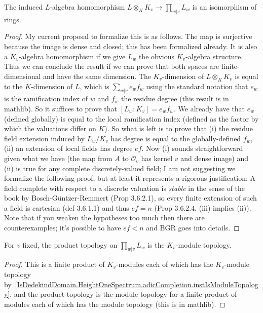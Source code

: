 \begin{theorem}
  \label{IsDedekindDomain.HeightOneSpectrum.adicCompletion.baseChangeAlgEquiv}
  \leanok
  The induced $L$-algebra homomorphism $L\otimes_KK_v\to\prod_{w|v}L_w$ is an
  isomorphism of rings.
\end{theorem}
\begin{proof}

  My current proposal to formalize this is as follows. The map is surjective
  because the image is dense and closed; this has been formalized already.
  It is also a $K_v$-algebra homomorphism if we give $L_w$ the obvious $K_v$-algebra
  structure. Thus we can conclude the result if we can prove that both spaces are
  finite-dimensional and have the same dimension. The $K_v$-dimension of $L\otimes_KK_v$
  is equal to the $K$-dimension of $L$, which is $\sum_{w|v}e_wf_w$ using the standard
  notation that $e_w$ is the ramification index of $w$ and $f_w$ the residue degree
  (this result is in mathlib). So it suffices to prove that $[L_w:K_v]=e_wf_w$.
  We already have that $e_w$ (defined globally) is equal to the local ramification
  index (defined as the factor by which the valuations differ on $K$). So what is left
  is to prove that (i) the residue field extension induced by $L_w/K_v$ has degree is equal to the
  globally-defined $f_w$, (ii) an extension of local fields has degree $ef$. Now (i) sounds
  straightforward given what we have (the map from $A$ to $\mathcal{O}_v$ has kernel $v$ and
  dense image) and (ii) is true for any complete discretely-valued field; I am not suggesting
  we formalize the following proof, but at least it represents a rigorous justification:
  A field complete with respect to a discrete valuation is \emph{stable} in the sense
  of the book by Bosch-G\"{u}ntzer-Remmert (Prop 3.6.2.1), so every finite extension of such a field
  is cartesian (def 3.6.1.1) and thus $ef=n$ (Prop 3.6.2.4, (iii) implies (ii)). Note
  that if you weaken the hypotheses too much then there are counterexamples; it's possible
  to have $ef<n$ and BGR goes into details.

\end{proof}

\begin{theorem}
  \label{IsDedekindDomain.HeightOneSpectrum.adicCompletion.instIsModuleTopologyPi}
  \leanok
  For $v$ fixed, the product topology on $\prod_{w|v}L_w$ is the $K_v$-module
  topology.
\end{theorem}
\begin{proof}
  \leanok
  This is a finite product of $K_v$-modules each of which has the $K_v$-module topology
  by~\ref{IsDedekindDomain.HeightOneSpectrum.adicCompletion.instIsModuleTopology},
  and the product topology is the module topology for a finite product of modules each of which
  has the module topology (this is in mathlib).
\end{proof}

